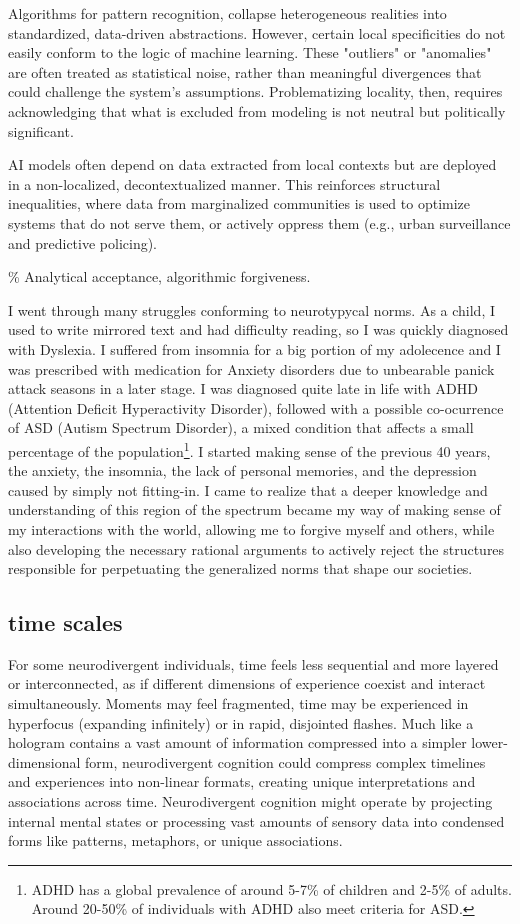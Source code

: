 Algorithms for pattern recognition, collapse heterogeneous realities into standardized, data-driven abstractions. However, certain local specificities do not easily conform to the logic of machine learning. These "outliers" or "anomalies" are often treated as statistical noise, rather than meaningful divergences that could challenge the system's assumptions. Problematizing locality, then, requires acknowledging that what is excluded from modeling is not neutral but politically significant.

AI models often depend on data extracted from local contexts but are deployed in a non-localized, decontextualized manner. This reinforces structural inequalities, where data from marginalized communities is used to optimize systems that do not serve them, or actively oppress them (e.g., urban surveillance and predictive policing).

{\scriptsize \textcolor{comment}{\% Analytical acceptance, algorithmic forgiveness. }}

I went through many struggles conforming to neurotypycal norms. As a child, I used to write mirrored text and had difficulty reading, so I was quickly diagnosed with Dyslexia. I suffered from insomnia for a big portion of my adolecence and I was prescribed with medication for Anxiety disorders due to unbearable panick attack seasons in a later stage. I was diagnosed quite late in life with ADHD (Attention Deficit Hyperactivity Disorder), followed with a possible co-ocurrence of ASD (Autism Spectrum Disorder), a mixed condition that affects a small percentage of the population\footnote{ADHD has a global prevalence of around 5-7\% of children and 2-5\% of adults. Around 20-50\% of individuals with ADHD also meet criteria for ASD.}. I started making sense of the previous 40 years, the anxiety, the insomnia, the lack of personal memories, and the depression caused by simply not fitting-in. I came to realize that a deeper knowledge and understanding of this region of the spectrum became my way of making sense of my interactions with the world, allowing me to forgive myself and others, while also developing the necessary rational arguments to actively reject the structures responsible for perpetuating the generalized norms that shape our societies.

\subsection*{time scales}

For some neurodivergent individuals, time feels less sequential and more layered or interconnected, as if different dimensions of experience coexist and interact simultaneously. Moments may feel fragmented, time may be experienced in hyperfocus (expanding infinitely) or in rapid, disjointed flashes. Much like a hologram contains a vast amount of information compressed into a simpler lower-dimensional form, neurodivergent cognition could compress complex timelines and experiences into non-linear formats, creating unique interpretations and associations across time.
Neurodivergent cognition might operate by projecting internal mental states or processing vast amounts of sensory data into condensed forms like patterns, metaphors, or unique associations. 

